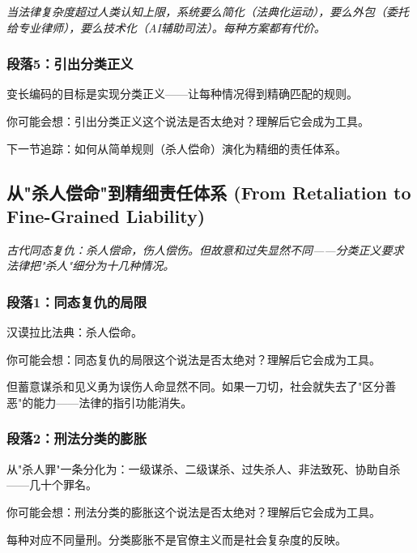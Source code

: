\documentclass[a4paper,12pt]{book}
\newenvironment{motivation}{\begin{tcolorbox}[colback=gray!10,colframe=gray!60,title=\textit{动机}]\small\itshape}{\end{tcolorbox}}
\begin{document}
\begin{motivation}
\begin{motivation}
\begin{motivation}
当法律复杂度超过人类认知上限，系统要么简化（法典化运动），要么外包（委托给专业律师），要么技术化（AI辅助司法）。每种方案都有代价。

	\subsubsection*{段落5：引出分类正义}
	变长编码的目标是实现分类正义——让每种情况得到精确匹配的规则。
	\begin{tcolorbox}[colback=yellow!5, title=\textit{读者行为预测}]
		你可能会想：引出分类正义这个说法是否太绝对？理解后它会成为工具。
	\end{tcolorbox}

下一节追踪：如何从简单规则（杀人偿命）演化为精细的责任体系。

	\subsection{从"杀人偿命"到精细责任体系 (From Retaliation to Fine-Grained Liability)}
	\begin{motivation}
		古代同态复仇：杀人偿命，伤人偿伤。但故意和过失显然不同——分类正义要求法律把"杀人"细分为十几种情况。
	\end{motivation}

	\subsubsection*{段落1：同态复仇的局限}
	汉谟拉比法典：杀人偿命。
	\begin{tcolorbox}[colback=yellow!5, title=\textit{读者行为预测}]
		你可能会想：同态复仇的局限这个说法是否太绝对？理解后它会成为工具。
	\end{tcolorbox}

但蓄意谋杀和见义勇为误伤人命显然不同。如果一刀切，社会就失去了"区分善恶"的能力——法律的指引功能消失。

	\subsubsection*{段落2：刑法分类的膨胀}
	从"杀人罪"一条分化为：一级谋杀、二级谋杀、过失杀人、非法致死、协助自杀——几十个罪名。
	\begin{tcolorbox}[colback=yellow!5, title=\textit{读者行为预测}]
		你可能会想：刑法分类的膨胀这个说法是否太绝对？理解后它会成为工具。
	\end{tcolorbox}

每种对应不同量刑。分类膨胀不是官僚主义而是社会复杂度的反映。


\end{motivation}
\end{motivation}
\end{motivation}
\end{document}
